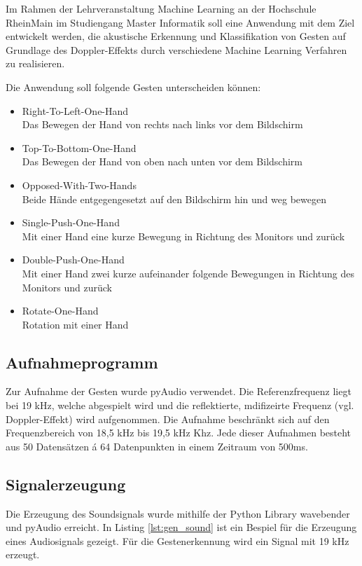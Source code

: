 Im Rahmen der Lehrveranstaltung Machine Learning an der Hochschule RheinMain im Studiengang Master Informatik soll eine Anwendung mit dem Ziel entwickelt werden, die akustische Erkennung und Klassifikation von Gesten auf Grundlage des Doppler-Effekts durch verschiedene Machine Learning Verfahren zu realisieren. 

Die Anwendung soll folgende Gesten unterscheiden können:
\begin{itemize}
	\item Right-To-Left-One-Hand\\
	Das Bewegen der Hand von rechts nach links vor dem Bildschirm
	\item Top-To-Bottom-One-Hand\\
	Das Bewegen der Hand von oben nach unten vor dem Bildschirm
	\item Opposed-With-Two-Hands\\
	Beide Hände entgegengesetzt auf den Bildschirm hin und weg bewegen
	\item Single-Push-One-Hand\\
	Mit einer Hand eine kurze Bewegung in Richtung des Monitors und zurück
	\item Double-Push-One-Hand\\
	Mit einer Hand zwei kurze aufeinander folgende Bewegungen in Richtung des Monitors und zurück
	\item Rotate-One-Hand\\
	Rotation mit einer Hand
\end{itemize}

\subsection{Aufnahmeprogramm}
\label{sec:gestures_dataformat}

Zur Aufnahme der Gesten wurde pyAudio verwendet. Die Referenzfrequenz liegt bei
19 kHz, welche abgespielt wird und die reflektierte, mdifizeirte Frequenz (vgl.
Doppler-Effekt) wird aufgenommen. Die Aufnahme beschränkt sich auf den
Frequenzbereich von 18,5 kHz bis 19,5 kHz Khz. Jede dieser Aufnahmen besteht aus
50 Datensätzen á 64 Datenpunkten in einem Zeitraum von 500ms. 

\subsection{Signalerzeugung}
Die Erzeugung des Soundsignals wurde mithilfe der Python Library wavebender und
pyAudio erreicht. In Listing \ref{lst:gen_sound} ist ein Bespiel für die
Erzeugung eines Audiosignals gezeigt. Für die Gestenerkennung wird ein Signal
mit 19 kHz erzeugt.

